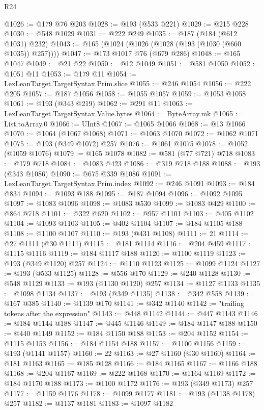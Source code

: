 \begin{lexlean}{R24}
\begin{coremodule}
@1026 := @179 @76 @203
@1028 := @193 (@533 @221)
@1029 := @215 @228
@1030 := @548 @1029
@1031 := @222 @249
@1035 := @187 (@184 (@612 @1031) @232)
@1043 := @165 (@1024 (@1026 (@1028 (@193 (@1030 (@660 @1035)) @257))))
@1047 := @173 @1017 @76 (@679 @286)
@1048 := @165 @1047
@1049 := @21 @22
@1050 := @12 @1049
@1051 := @581 @1050
@1052 := @1051 @11
@1053 := @179 @11
@1054 := LexLeanTarget.TargetSyntax.Prim.slice
@1055 := @246 @1054
@1056 := @222 @205
@1057 := @187 @1056
@1058 := @1055 @1057
@1059 := @1053 @1058
@1061 := @193 (@343 @219)
@1062 := @291 @11
@1063 := LexLeanTarget.TargetSyntax.Value.bytes
@1064 := ByteArray.mk
@1065 := List.toArray.{0}
@1066 := UInt8
@1067 := @1065 @1066
@1068 := @13 @1066
@1070 := @1064 (@1067 @1068)
@1071 := @1063 @1070
@1072 := @1062 @1071
@1075 := @193 (@349 @1072) @257
@1076 := @1061 @1075
@1078 := @1052 (@1059 @1076)
@1079 := @165 @1078
@1082 := @581 (@77 @721) @718
@1083 := @179 @718
@1084 := @1083 @423
@1086 := @319 @718 @188
@1088 := @193 (@343 @1086)
@1090 := @675 @339 @1086
@1091 := LexLeanTarget.TargetSyntax.Prim.index
@1092 := @246 @1091
@1093 := @184 @834
@1094 := @1093 @188
@1095 := @187 @1094
@1096 := @1092 @1095
@1097 := @1083 @1096
@1098 := @1083 @530
@1099 := @1083 @429
@1100 := @864 @718
@1101 := @322 @620
@1102 := @957 @1101
@1103 := @405 @1102
@1104 := @1093 @1103
@1105 := @402 @1104
@1107 := @184 @1105 @188
@1108 := @1100 @1107
@1110 := @193 (@431 @1108)
@1111 := 21
@1114 := @27 @1111 (@30 @1111)
@1115 := @181 @1114
@1116 := @204 @459
@1117 := @1115 @1116
@1119 := @184 @1117 @188
@1120 := @1100 @1119
@1123 := @193 (@349 @1120) @257
@1124 := @1110 @1123
@1125 := @1099 @1124
@1127 := @193 (@533 @1125)
@1128 := @556 @170
@1129 := @240 @1128
@1130 := @548 @1129
@1133 := @193 (@1130 @1120) @257
@1134 := @1127 @1133
@1135 := @1098 @1134
@1137 := @193 (@349 @1135)
@1138 := @342 @558
@1139 := @167 @385
@1140 := @1139 @170
@1141 := @342 @1140
@1142 := "trailing tokens after the expression"
@1143 := @448 @1142
@1144 := @447 @1143
@1146 := @184 @1144 @188
@1147 := @445 @1146
@1149 := @184 @1147 @188
@1150 := @440 @1149
@1152 := @184 @1150 @188
@1153 := @204 @1152
@1154 := @1115 @1153
@1156 := @184 @1154 @188
@1157 := @1100 @1156
@1159 := @193 (@1141 @1157)
@1160 := 22
@1163 := @27 @1160 (@30 @1160)
@1164 := @181 @1163
@1165 := @185 @128
@1166 := @184 @1165
@1167 := @1166 @188
@1168 := @204 @1167
@1169 := @222 @1168
@1170 := @1164 @1169
@1172 := @184 @1170 @188
@1173 := @1100 @1172
@1176 := @193 (@349 @1173) @257
@1177 := @1159 @1176
@1178 := @1099 @1177
@1181 := @193 (@1138 @1178) @257
@1182 := @1137 @1181
@1183 := @1097 @1182

\end{coremodule}
\end{lexlean}
